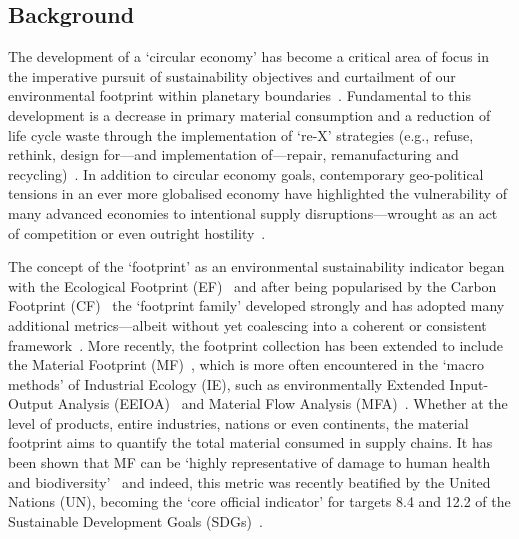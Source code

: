 \subsection{Background}\label{sec:intro-background}

The development of a `circular economy' has become a critical area of focus in the imperative pursuit of sustainability objectives and curtailment of our environmental footprint within planetary boundaries~\citep{eu2019greendeal, eu2020circ,nl2023ceplan,nl2016ceplan,pardo2018ce,ellenmacarthur2015ce}. Fundamental to this development is a decrease in primary material consumption and a reduction of life cycle waste through the implementation of `re-X' strategies (e.g., refuse, rethink, design for---and implementation of---repair, remanufacturing and recycling)~\citep{reike2018rex, eu2022ecodesign, eu2022repair,eu2015reman}. In addition to circular economy goals, contemporary geo-political tensions in an ever more globalised economy have highlighted the vulnerability of many advanced economies to intentional supply disruptions---wrought as an act of competition or even outright hostility~\citep{jrc2023supplychain,hartley2024cepolitics,berry2023crm}.

The concept of the `footprint' as an environmental sustainability indicator began with the Ecological Footprint (EF)~\citep{wackernagel1994ecologicalfootprint} and after being popularised by the Carbon Footprint (CF)~\citep{cucek2015environmentalfootprints} the `footprint family' developed strongly and has adopted many additional metrics---albeit without yet coalescing into a coherent or consistent framework~\citep{giampietro2014footprintstonowhere, vanham2019footprints,ridoutt2013footprints}. More recently, the footprint collection has been extended to include the Material Footprint (MF)~\citep{weidmann2013materialfootprint}, which is more often encountered in the `macro methods' of Industrial Ecology (IE), such as environmentally Extended Input-Output Analysis (EEIOA)~\citep{lenzen2022materialfootprint} and Material Flow Analysis (MFA)~\citep{schaffartzik2013mfafootprint}. Whether at the level of products, entire industries, nations or even continents, the material footprint aims to quantify the total material consumed in supply chains. It has been shown that MF can be `highly representative of damage to human health and biodiversity'~\citep{steinmann2017resourcefootprints} and indeed, this metric was recently beatified by the United Nations (UN), becoming the `core official indicator' for targets 8.4 and 12.2 of the Sustainable Development Goals (SDGs)~\citep{lenzen2022materialfootprint}.

